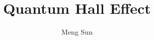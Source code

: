 \documentclass{tufte-book}
\title{Quantum Hall Effect}
\author{Meng Sun}
\begin{document}
\maketitle
\tableofcontents




{}

\end{document}
